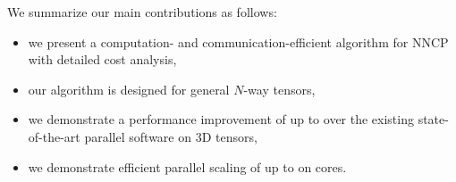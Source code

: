We summarize our main contributions as follows:
\begin{itemize}
		\item we present a computation- and communication-efficient algorithm for NNCP with detailed cost analysis,
		\item our algorithm is designed for general $N$-way tensors,
		\item we demonstrate a performance improvement of up to \grey{$2.2\times$} over the existing state-of-the-art parallel software on 3D tensors,
		\item we demonstrate efficient parallel scaling of up to \grey{$253\times$} on  cores.
\end{itemize}